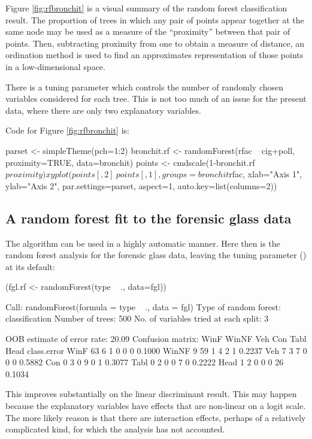 Figure \ref{fig:rfbronchit} is a visual summary of the random forest
classification result.  The proportion of trees in which any pair of
points appear together at the same node may be used as a measure of
the ``proximity'' between that pair of points.  Then, subtracting
proximity from one to obtain a measure of distance, an ordination
method is used to find an approximates representation of those points in a
low-dimensional space.

There is a tuning parameter  which controls the number of
randomly chosen variables considered for each tree.  This is not too
much of an issue for the present data, where there are only two
explanatory variables.

Code for Figure \ref{fig:rfbronchit} is:
\begin{Schunk}
\begin{Sinput}
parset <- simpleTheme(pch=1:2)
bronchit.rf <- randomForest(rfac ~ cig+poll,
                            proximity=TRUE,
                            data=bronchit)
points <- cmdscale(1-bronchit.rf$proximity)
xyplot(points[,2] ~ points[,1],
       groups=bronchit$rfac,
       xlab="Axis 1", ylab="Axis 2",
       par.settings=parset, aspect=1,
       auto.key=list(columns=2))
\end{Sinput}
\end{Schunk}

\subsection*{A random forest fit to the forensic glass data}

The algorithm can be used in a highly automatic manner.  Here then is
the random forest analysis for the forensic glass data, leaving the
tuning parameter () at its default:
\begin{Schunk}
\begin{Sinput}
(fgl.rf <- randomForest(type ~ ., data=fgl))
\end{Sinput}
\begin{Soutput}

Call:
 randomForest(formula = type ~ ., data = fgl) 
               Type of random forest: classification
                     Number of trees: 500
No. of variables tried at each split: 3

        OOB estimate of  error rate: 20.09%
Confusion matrix:
      WinF WinNF Veh Con Tabl Head class.error
WinF    63     6   1   0    0    0      0.1000
WinNF    9    59   1   4    2    1      0.2237
Veh      7     3   7   0    0    0      0.5882
Con      0     3   0   9    0    1      0.3077
Tabl     0     2   0   0    7    0      0.2222
Head     1     2   0   0    0   26      0.1034
\end{Soutput}
\end{Schunk}
This improves substantially on the linear discriminant result.
This may happen because the explanatory variables have effects
that are non-linear on a logit scale.  The more likely reason
is that there are interaction effects, perhaps of a relatively
complicated kind, for which the  analysis has not
accounted.


